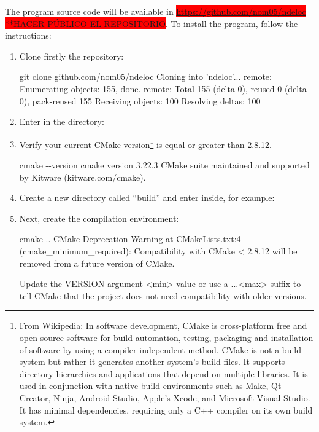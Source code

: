 \documentclass[a4paper,11pt,openany]{memoir}
\begin{document}
The program source code will be available in \colorbox{red}{\url{https://github.com/nom05/ndeloc} **HACER PÚBLICO EL REPOSITORIO}. To install the program, follow the instructions:
\begin{enumerate}
	\item Clone firstly the repository:
		\begin{consola}{git clone github.com/nom05/ndeloc}
Cloning into 'ndeloc'...
remote: Enumerating objects: 155, done.
remote: Total 155 (delta 0), reused 0 (delta 0), pack-reused 155
Receiving objects: 100%
Resolving deltas: 100%
\end{consola}
	\item Enter in the directory:
	\item Verify your current CMake version\footnote{From Wikipedia: In software development, CMake is cross-platform free and open-source software for build automation, testing, packaging and installation of software by using a compiler-independent method. CMake is not a build system but rather it generates another system's build files. It supports directory hierarchies and applications that depend on multiple libraries. It is used in conjunction with native build environments such as Make, Qt Creator, Ninja, Android Studio, Apple's Xcode, and Microsoft Visual Studio. It has minimal dependencies, requiring only a C++ compiler on its own build system.} is equal or greater than 2.8.12.
		\begin{consola}{cmake -{}-version}
cmake version 3.22.3
CMake suite maintained and supported by Kitware (kitware.com/cmake).
\end{consola}
	\item Create a new directory called ``build'' and enter inside, for example:
	\item Next, create the compilation environment:
		\begin{consola}{cmake ..}
CMake Deprecation Warning at CMakeLists.txt:4 (cmake_minimum_required):
Compatibility with CMake < 2.8.12 will be removed from a future version of
CMake.

Update the VERSION argument <min> value or use a ...<max> suffix to tell
CMake that the project does not need compatibility with older versions.



\end{consola}
\end{enumerate}
\end{document}
